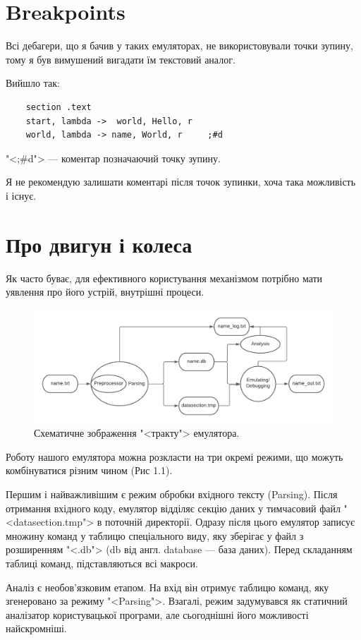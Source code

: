 \documentclass[oneside,final,14pt]{extreport}
\begin{document}
\section{Breakpoints}
Всі дебагери, що я бачив у таких емуляторах, не використовували точки зупину, тому я був вимушений вигадати їм текстовий аналог.

Вийшло так:

\begin{Verbatim}
	section .text
	start, lambda ->  world, Hello, r	  
	world, lambda -> name, World, r	    ;#d
\end{Verbatim}
"<;\#d"> --- коментар позначаючий точку зупину. 

Я не рекомендую залишати коментарі після точок зупинки, хоча така можливість і існує.
\section{Про двигун і колеса}
\label{chap:emulator:func}
Як часто буває, для ефективного користування механізмом потрібно мати уявлення про його устрій, внутрішні процеси.


\begin{figure}
\includegraphics[scale=0.8]{2}
\caption{Схематичне зображення "<тракту"> емулятора.}
\end{figure}

Роботу нашого емулятора можна розкласти на три окремі режими, що можуть комбінуватися різним чином (Рис 1.1).

Першим і найважливішим є режим обробки вхідного тексту (Parsing). Після отримання вхідного коду, емулятор відділяє секцію даних у тимчасовий файл "<datasection.tmp"> в поточній директорії. Одразу після цього емулятор записує множину команд у таблицю спеціального виду, яку зберігає у файл з розширенням "<.db"> (db від англ. database --- база даних). Перед складанням таблиці команд, підставляються всі макроси.

Аналіз є необов'язковим етапом. На вхід він отримує таблицю команд, яку згенеровано за режиму "<Parsing">. Взагалі, режим задумувався як статичний аналізатор користувацької програми, але сьогоднішні його можливості найскромніші.
\end{document}
